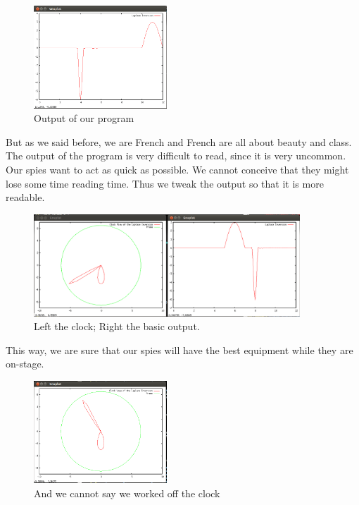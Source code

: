 \documentclass[11pt,a4paper]{article}
\begin{document}
\begin{figure}[!h]
\centering
\includegraphics[width=5cm]{clock1.png}
\caption{Output of our program}
\label{clock1}
\end{figure}


But as we said before, we are French and French are all about beauty and class. The output of the program is very difficult to read, since it is very uncommon. Our spies want to act as quick as possible. We cannot conceive that they might lose some time reading time. Thus we tweak the output so that it is more readable.

\begin{figure}[!h]
\centering
\includegraphics[width=10cm]{clock2.png}
\caption{Left the clock; Right the basic output.}
\label{clock2}
\end{figure}

This way, we are sure that our spies will have the best equipment while they are on-stage.

\begin{figure}[!h]
\centering
\includegraphics[width=5cm]{clock3.png}
\caption{And we cannot say we worked off the clock}
\label{clock3}
\end{figure}

\newpage

\appendix
\end{document}
